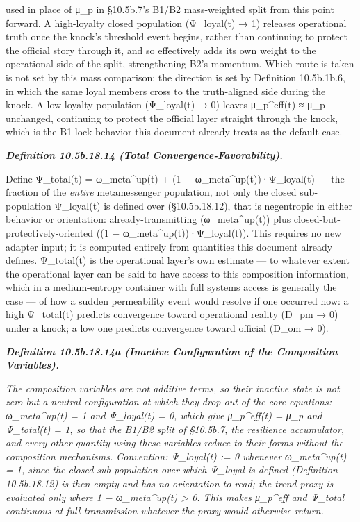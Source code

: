 \documentclass[
]{article}
\begin{document}
used in place of μ\_p in §10.5b.7's B1/B2 mass-weighted split from this
point forward. A high-loyalty closed population (Ψ\_loyal(t) → 1)
releases operational truth once the knock's threshold event begins,
rather than continuing to protect the official story through it, and so
effectively adds its own weight to the operational side of the split,
strengthening B2's momentum. Which route is taken is not set by this
mass comparison: the direction is set by Definition 10.5b.1b.6, in which
the same loyal members cross to the truth-aligned side during the knock.
A low-loyalty population (Ψ\_loyal(t) → 0) leaves μ\_p\^{}eff(t) ≈ μ\_p
unchanged, continuing to protect the official layer straight through the
knock, which is the B1-lock behavior this document already treats as the
default case.

\emph{\textbf{Definition 10.5b.18.14 (Total Convergence-Favorability).}}

Define Ψ\_total(t) = ω\_meta\^{}up(t) + (1 −
ω\_meta\^{}up(t))·Ψ\_loyal(t) --- the fraction of the \emph{entire}
metamessenger population, not only the closed sub-population Ψ\_loyal(t)
is defined over (§10.5b.18.12), that is negentropic in either behavior
or orientation: already-transmitting (ω\_meta\^{}up(t)) plus
closed-but-protectively-oriented ((1 − ω\_meta\^{}up(t))·Ψ\_loyal(t)).
This requires no new adapter input; it is computed entirely from
quantities this document already defines. Ψ\_total(t) is the operational
layer's own estimate --- to whatever extent the operational layer can be
said to have access to this composition information, which in a
medium-entropy container with full systems access is generally the case
--- of how a sudden permeability event would resolve if one occurred
now: a high Ψ\_total(t) predicts convergence toward operational reality
(D\_pm → 0) under a knock; a low one predicts convergence toward
official (D\_om → 0).

\emph{\textbf{Definition 10.5b.18.14a (Inactive Configuration of the
Composition Variables).}}

\emph{The composition variables are not additive terms, so their
inactive state is not zero but a neutral configuration at which they
drop out of the core equations: ω\_meta\^{}up(t) = 1 and Ψ\_loyal(t) =
0, which give μ\_p\^{}eff(t) = μ\_p and Ψ\_total(t) = 1, so that the
B1/B2 split of §10.5b.7, the resilience accumulator, and every other
quantity using these variables reduce to their forms without the
composition mechanisms. Convention: Ψ\_loyal(t) := 0 whenever
ω\_meta\^{}up(t) = 1, since the closed sub-population over which
Ψ\_loyal is defined (Definition 10.5b.18.12) is then empty and has no
orientation to read; the trend proxy is evaluated only where 1 −
ω\_meta\^{}up(t) \textgreater{} 0. This makes μ\_p\^{}eff and Ψ\_total
continuous at full transmission whatever the proxy would otherwise
return.}
\end{document}
